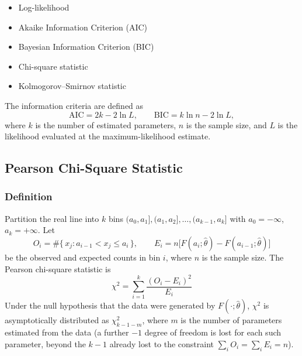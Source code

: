 \begin{itemize}[leftmargin=*]
    \item Log-likelihood
    \item Akaike Information Criterion (AIC)
    \item Bayesian Information Criterion (BIC)
    \item Chi-square statistic
    \item Kolmogorov--Smirnov statistic
\end{itemize}

The information criteria are defined as
\[
    \mathrm{AIC} = 2k - 2\ln L, \qquad
    \mathrm{BIC} = k \ln n - 2 \ln L,
\]
where $k$ is the number of estimated parameters, $n$ is the sample size,
and $L$ is the likelihood evaluated at the maximum-likelihood estimate.

\subsection{Pearson Chi-Square Statistic}

\subsubsection{Definition}
Partition the real line into $k$ bins $(a_0, a_1], (a_1, a_2], \dots, (a_{k-1}, a_k]$ with
$a_0 = -\infty$, $a_k = +\infty$. Let
\[
O_i = \#\{\, x_j : a_{i-1} < x_j \le a_i \,\}, \qquad
E_i = n \Big[F(a_i;\hat\theta) - F(a_{i-1};\hat\theta)\Big]
\]
be the observed and expected counts in bin $i$, where $n$ is the sample size. The Pearson
chi-square statistic is
\[
\boxed{\;\chi^2 = \sum_{i=1}^{k} \frac{(O_i - E_i)^2}{E_i}\;}
\]
Under the null hypothesis that the data were generated by $F(\cdot;\hat\theta)$, $\chi^2$ is
asymptotically distributed as $\chi^2_{k-1-m}$, where $m$ is the number of parameters
estimated from the data (a further $-1$ degree of freedom is lost for each such parameter,
beyond the $k-1$ already lost to the constraint $\sum_i O_i = \sum_i E_i = n$).

